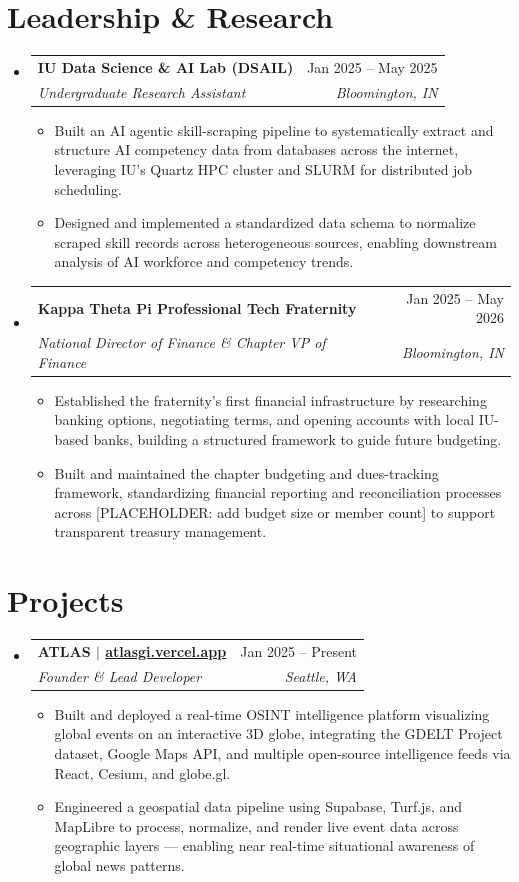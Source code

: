 \documentclass[letterpaper,11pt]{article}
\makeatletter
\newcommand{\resumeItem}[1]{\item\small{#1 \vspace{-2pt}}}
\newcommand{\resumeSubheading}[4]{\vspace{-2pt}\item\begin{tabular*}{0.97\textwidth}[t]{l@{\extracolsep{\fill}}r}\textbf{#1} & #2 \\\textit{\small#3} & \textit{\small #4} \\\end{tabular*}\vspace{-7pt}}
\newcommand{\resumeSubHeadingListStart}{\begin{itemize}[leftmargin=0.15in, label={}]}
\newcommand{\resumeSubHeadingListEnd}{\end{itemize}}
\newcommand{\resumeItemListStart}{\begin{itemize}}
\newcommand{\resumeItemListEnd}{\end{itemize}\vspace{-5pt}}
\makeatother
\begin{document}
\section{Leadership \& Research}
  \resumeSubHeadingListStart
    \resumeSubheading
      {IU Data Science \& AI Lab (DSAIL)}{Jan 2025 -- May 2025}
      {Undergraduate Research Assistant}{Bloomington, IN}
      \resumeItemListStart
        \resumeItem{Built an AI agentic skill-scraping pipeline to systematically extract and structure AI competency data from databases across the internet, leveraging IU's Quartz HPC cluster and SLURM for distributed job scheduling.}
        \resumeItem{Designed and implemented a standardized data schema to normalize scraped skill records across heterogeneous sources, enabling downstream analysis of AI workforce and competency trends.}
      \resumeItemListEnd
    \resumeSubheading
      {Kappa Theta Pi Professional Tech Fraternity}{Jan 2025 -- May 2026}
      {National Director of Finance \& Chapter VP of Finance}{Bloomington, IN}
      \resumeItemListStart
        \resumeItem{Established the fraternity's first financial infrastructure by researching banking options, negotiating terms, and opening accounts with local IU-based banks, building a structured framework to guide future budgeting.}
        \resumeItem{Built and maintained the chapter budgeting and dues-tracking framework, standardizing financial reporting and reconciliation processes across [PLACEHOLDER: add budget size or member count] to support transparent treasury management.}
      \resumeItemListEnd
  \resumeSubHeadingListEnd

\section{Projects}
  \resumeSubHeadingListStart
    \resumeSubheading
      {ATLAS $|$ \href{https://atlasgi.vercel.app}{atlasgi.vercel.app}}{Jan 2025 -- Present}
      {Founder \& Lead Developer}{Seattle, WA}
      \resumeItemListStart
        \resumeItem{Built and deployed a real-time OSINT intelligence platform visualizing global events on an interactive 3D globe, integrating the GDELT Project dataset, Google Maps API, and multiple open-source intelligence feeds via React, Cesium, and globe.gl.}
        \resumeItem{Engineered a geospatial data pipeline using Supabase, Turf.js, and MapLibre to process, normalize, and render live event data across geographic layers — enabling near real-time situational awareness of global news patterns.}
      \resumeItemListEnd
  \resumeSubHeadingListEnd
\end{document}
